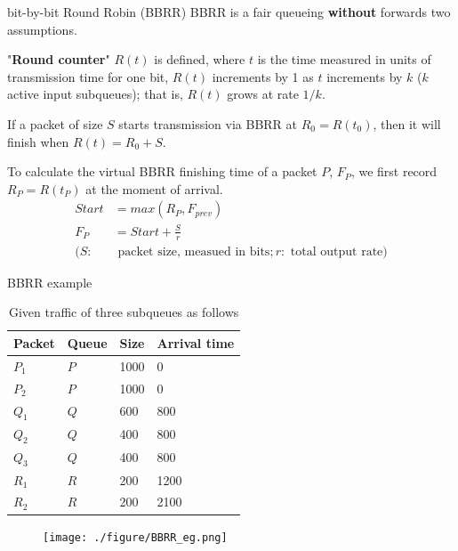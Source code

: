 \documentclass[10pt]{beamer}
\begin{document}
\begin{frame}{bit-by-bit Round Robin (BBRR)}
BBRR is a fair queueing \textbf{without} forwards two assumptions.

"\textbf{Round counter}" $R(t)$ is defined, where $t$ is the time measured in units of transmission time for one bit, $R(t)$ increments by 1 as $t$ increments by $k$ ($k$ active input subqueues); that is, $R(t)$ grows at rate $1/k$.

If a packet of size $S$ starts transmission via BBRR at $R_0 = R(t_0)$, then it will finish when $R(t) = R_0 + S$.

To calculate the virtual BBRR finishing time of a packet $P$, $F_P$, we first record $R_P = R(t_P)$ at the moment of arrival.
\begin{align}
Start &= max(R_P, F_{prev}) \nonumber\\
F_P 	  &= Start + \frac{S}{r} \\
(S: &\text{ packet size, measued in bits}; r: \text{ total output rate}) \nonumber
\end{align}
\end{frame}

\begin{frame}{BBRR example}
\begin{table}
\caption{Given traffic of three subqueues as follows}
\begin{tabular}{llll}
\toprule
Packet & Queue & Size & Arrival time\\
\midrule
$P_1$  & $P$   & 1000 & 0 \\
$P_2$  & $P$   & 1000 & 0 \\
$Q_1$  & $Q$   & 600  & 800 \\
$Q_2$  & $Q$   & 400  & 800 \\
$Q_3$  & $Q$   & 400 & 800 \\
$R_1$  & $R$   & 200 & 1200 \\
$R_2$  & $R$   & 200 & 2100 \\
\bottomrule
\end{tabular}
\end{table}
\begin{figure}
\texttt{[image: ./figure/BBRR\_eg.png]}
\end{figure}
\end{frame}
\end{document}
